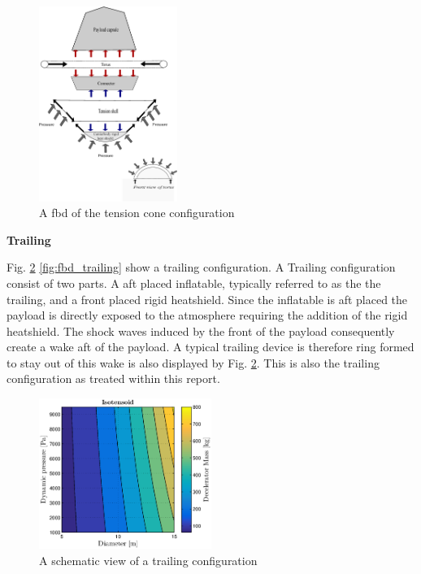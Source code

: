 \begin{figure}[H]
\centering
\includegraphics[width = 0.4\textwidth]{Figure/FBD_tensioncone.eps}
\caption{A \gls{fbd} of the tension cone configuration}
\label{fig:fbd_tension}
\end{figure}

\textbf{Trailing}

Fig. \ref{fig:conc_trailing} \ref{fig:fbd_trailing} show a trailing configuration. A Trailing configuration consist of two parts. A aft placed inflatable, typically referred to as the the trailing, and a front placed rigid heatshield. Since the inflatable is aft placed the payload is directly exposed to the atmosphere requiring the addition of the rigid heatshield. The shock waves induced by the front of the payload consequently create a wake aft of the payload. A typical trailing device is therefore ring formed to stay out of this wake is also displayed by Fig. \ref{fig:conc_trailing}. This is also the trailing configuration as treated within this report.

\begin{figure}[H]
\centering
\includegraphics[width = 0.5\textwidth]{Figure/ISO_comp.eps}
\caption{A schematic view of a trailing configuration}
\label{fig:conc_trailing}
\end{figure}

